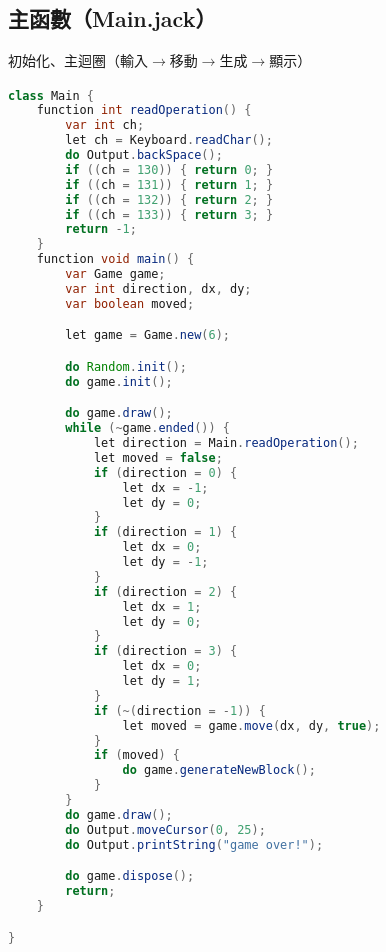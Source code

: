 \documentclass[pstricks, 12pt, a4paper]{article}
\newcommand{\then}[2][]{\xrightarrow[#1]{#2}}
\begin{document}
  \subsection{主函數（Main.jack）}
    初始化、主迴圈（輸入$\then{}$移動$\then{}$生成$\then{}$顯示）
    \begin{lstlisting}[language=Java, frame=single]
class Main {
    function int readOperation() {
        var int ch;
        let ch = Keyboard.readChar();
        do Output.backSpace();
        if ((ch = 130)) { return 0; }
        if ((ch = 131)) { return 1; }
        if ((ch = 132)) { return 2; }
        if ((ch = 133)) { return 3; }
        return -1;
    }
    function void main() {
        var Game game;
        var int direction, dx, dy;
        var boolean moved;

        let game = Game.new(6);

        do Random.init();
        do game.init();

        do game.draw();
        while (~game.ended()) {
            let direction = Main.readOperation();
            let moved = false;
            if (direction = 0) {
                let dx = -1;
                let dy = 0;
            }
            if (direction = 1) {
                let dx = 0;
                let dy = -1;
            }
            if (direction = 2) {
                let dx = 1;
                let dy = 0;
            }
            if (direction = 3) {
                let dx = 0;
                let dy = 1;
            }
            if (~(direction = -1)) {
                let moved = game.move(dx, dy, true);
            }
            if (moved) {
                do game.generateNewBlock();
            }
        }
        do game.draw();
        do Output.moveCursor(0, 25);
        do Output.printString("game over!");

        do game.dispose();
        return;
    }

}
    \end{lstlisting}
\end{document}
